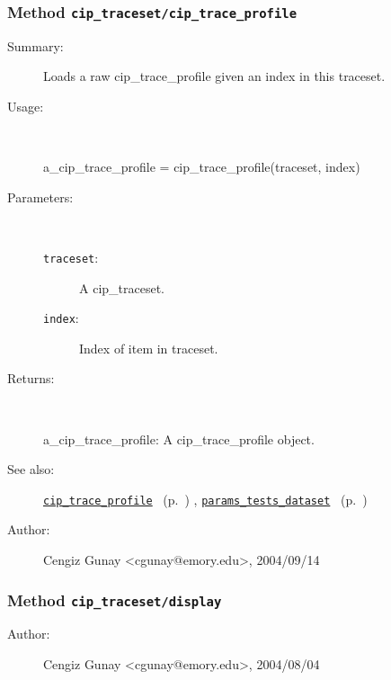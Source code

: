 \subsubsection[Method \texttt{cip\_trace\_profile}]{Method \texttt{cip\_traceset/cip\_trace\_profile}}%
%
\label{ref_cip_traceset__cip_trace_profile}%
\hypertarget{ref_cip_traceset__cip_trace_profile}{}%
\begin{description}
\item[Summary:]Loads a raw cip\_trace\_profile given an index in this traceset.
%
\item[Usage:]~%
\begin{lyxcode}%
a\_cip\_trace\_profile = cip\_trace\_profile(traceset, index)
%
\end{lyxcode}%
%
%
\item[Parameters:]~
\begin{description}%
\item[\texttt{traceset}:]
 A cip\_traceset.
\item[\texttt{index}:]
 Index of item in traceset.
\end{description}%
%
\item[Returns:
]~

	a\_cip\_trace\_profile: A cip\_trace\_profile object.
%
%
\item[See also:]%
\hyperlink{ref_cip_trace_profile}{\texttt{cip\_trace\_profile}}%
\ (p.~\pageref{ref_cip_trace_profile})%
%
, \hyperlink{ref_params_tests_dataset}{\texttt{params\_tests\_dataset}}%
\ (p.~\pageref{ref_params_tests_dataset})%
%
%
\item[Author:]%
Cengiz Gunay <cgunay@emory.edu>, 2004/09/14
%
\end{description}
\methodline%
\subsubsection[Method \texttt{display}]{Method \texttt{cip\_traceset/display}}%
%
\label{ref_cip_traceset__display}%
\hypertarget{ref_cip_traceset__display}{}%
\begin{description}
%
%
%
%
%
%
%
\item[Author:]%
Cengiz Gunay <cgunay@emory.edu>, 2004/08/04
%
\end{description}
\methodline%
